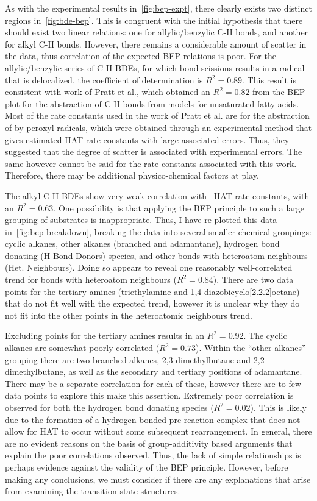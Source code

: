 As with the experimental results in~\ref{fig:bep-expt}, there clearly exists two
distinct regions in~\ref{fig:bde-bep}. This is congruent with the initial
hypothesis that there should exist two linear relations: one for
allylic/benzylic C-H bonds, and another for alkyl C-H bonds. However, there
remains a considerable amount of scatter in the data, thus correlation of the
expected BEP relations is poor. For the allylic/benzylic series of C-H BDEs, for
which bond scissions results in a radical that is delocalized, the coefficient
of determination is $R^2 = 0.89$. This result is consistent with work of Pratt
et al.\cite{Pratt2003}, which obtained an $R^2 = 0.82$ from the BEP plot for the
abstraction of C-H bonds from models for unsaturated fatty acids. Most of the
rate constants used in the work of Pratt et al. are for the abstraction of
 by peroxyl radicals, which were obtained through an experimental method
that gives estimated HAT rate constants with large associated errors. Thus, they
suggested that the degree of scatter is associated with experimental errors. The
same however cannot be said for the rate constants associated with this work.
Therefore, there may be additional physico-chemical factors at play.

The alkyl C-H BDEs show very weak correlation with \cumo\ HAT rate constants,
with an $R^2 =0.63$. One possibility is that applying the BEP principle to such
a large grouping of substrates is inappropriate. Thus, I have re-plotted this
data in~\ref{fig:bep-breakdown}, breaking the data into several smaller chemical
groupings: cyclic alkanes, other alkanes (branched and adamantane), hydrogen
bond donating (H-Bond Donors) species, and other  bonds with heteroatom
neighbours (Het. Neighbours). Doing so appears to reveal one reasonably
well-correlated trend for  bonds with heteroatom neighbours ($R^2 =
0.84$). There are two data points for the tertiary amines (triethylamine and
1,4-diazobicyclo[2.2.2]octane) that do not fit well with the expected trend,
however it is unclear why they do not fit into the other points in the
heteroatomic neighbours trend.

Excluding points for the tertiary amines results in an $R^2 = 0.92$.  The cyclic
alkanes are somewhat poorly correlated ($R^2 = 0.73$). Within the ``other
alkanes'' grouping there are two branched alkanes, 2,3-dimethylbutane and
2,2-dimethylbutane, as well as the secondary and tertiary  positions of
adamantane. There may be a separate correlation for each of these, however
there are to few data points to explore this make this assertion. Extremely
poor correlation is observed for both the hydrogen bond donating species ($R^2
= 0.02$). This is likely due to the formation of a hydrogen bonded pre-reaction
complex that does not allow for HAT to occur without some subsequent
rearrangement. In general, there are no evident reasons on the basis of
group-additivity based arguments that explain the poor correlations observed.
Thus, the lack of simple relationships is perhaps evidence against the validity
of the BEP principle. However, before making any conclusions, we must consider
if there are any explanations that arise from examining the transition state
structures.

